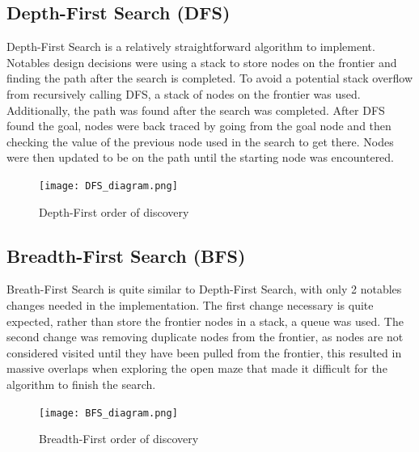 \documentclass{article}
\begin{document}
\subsection{Depth-First Search (DFS)}
Depth-First Search is a relatively straightforward algorithm to implement. Notables design decisions were using a stack to store nodes on the frontier and finding the path after the search is completed. To avoid a potential stack overflow from recursively calling DFS, a stack of nodes on the frontier was used. Additionally, the path was found after the search was completed. After DFS found the goal, nodes were back traced by going from the goal node and then checking the value of the previous node used in the search to get there. Nodes were then updated to be on the path until the starting node was encountered.
\begin{figure}
	\centering
	\texttt{[image: DFS\_diagram.png]}
	\caption{Depth-First order of discovery}
	\label{fig:dfs_figure}
\end{figure}



\subsection{Breadth-First Search (BFS)}
Breath-First Search is quite similar to Depth-First Search, with only 2 notables changes needed in the implementation. The first change necessary is quite expected, rather than store the frontier nodes in a stack, a queue was used. The second change was removing duplicate nodes from the frontier, as nodes are not considered visited until they have been pulled from the frontier, this resulted in massive overlaps when exploring the open maze that made it difficult for the algorithm to finish the search.
\begin{figure}
	\centering
	\texttt{[image: BFS\_diagram.png]}
	\caption{Breadth-First order of discovery}
	\label{fig:bfs_figure}
\end{figure}


\end{document}

